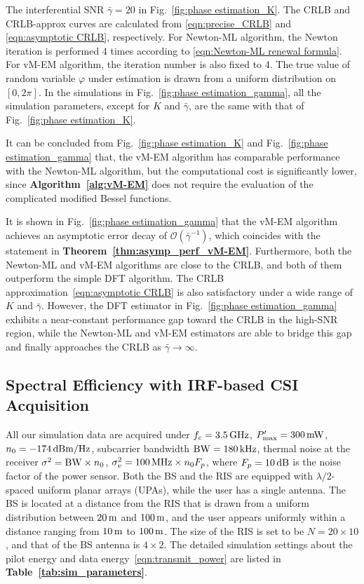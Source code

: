 \documentclass[journal,twocolumn]{IEEEtran}
\theoremstyle{nonumberplain}
\begin{document}
    The interferential SNR $\bar{\gamma}=20$ in Fig.~\ref{fig:phase estimation_K}. 
    The CRLB and CRLB-approx curves are calculated from \eqref{eqn:precise_CRLB} and \eqref{eqn:asymptotic CRLB}, respectively. 
    For Newton-ML algorithm, the Newton iteration is performed 4 times according to \eqref{eqn:Newton-ML renewal formula}. 
    For vM-EM algorithm, the iteration number is also fixed to 4. The true value of random variable $\varphi$ under estimation is drawn from a uniform distribution on $[0,2\pi]$. 
    In the simulations in Fig.~\ref{fig:phase estimation_gamma}, all the simulation parameters, except for $K$ and $\bar{\gamma}$, are the same with that of Fig.~\ref{fig:phase estimation_K}.

    It can be concluded from Fig.~\ref{fig:phase estimation_K} and Fig.~\ref{fig:phase estimation_gamma} that, the vM-EM algorithm has comparable performance with the Newton-ML algorithm, but the computational cost is significantly lower, since {\bf Algorithm~\ref{alg:vM-EM}} does not require the evaluation of the complicated modified Bessel functions. 
    
    It is shown in Fig.~\ref{fig:phase estimation_gamma} that the vM-EM algorithm achieves an asymptotic error decay of $\mathcal{O}(\bar{\gamma}^{-1})$, which coincides with the statement in {\bf Theorem~\ref{thm:asymp_perf_vM-EM}}. Furthermore, both the Newton-ML and vM-EM algorithms are close to the CRLB, and both of them outperform the simple DFT algorithm. The CRLB approximation~\eqref{eqn:asymptotic CRLB} is also satisfactory under a wide range of $K$ and $\bar{\gamma}$. However, the DFT estimator in Fig.~\ref{fig:phase estimation_gamma} exhibits a near-constant performance gap toward the CRLB in the high-SNR region, while the Newton-ML and vM-EM estimators are able to bridge this gap and finally approaches the CRLB as $\bar{\gamma}\to\infty$. 
    

\subsection{Spectral Efficiency with IRF-based CSI Acquisition} \label{Achievable Spectral Efficiency under IRF}

    All our simulation data are acquired under $f_c = 3.5\,{\rm GHz}$, $P_{\rm max}'=300 \,{\rm mW}$, $n_0=-174\,{\rm dBm/Hz}$, subcarrier bandwidth ${\rm BW} = 180\,{\rm kHz}$, thermal noise at the receiver $\sigma^2 = {\rm BW}\times n_0$, $\sigma_v^2=100\,{\rm MHz}\times n_0 F_p$, where $F_p=10\,{\rm dB}$ is the noise factor of the power sensor. 
    Both the BS and the RIS are equipped with $\lambda/2$-spaced uniform planar arrays (UPAs), while the user has a single antenna. 
    The BS is located at a distance from the RIS that is drawn from a uniform distribution between $20\,{\rm m}$ and $100\,{\rm m}$, and the user appears uniformly within a distance ranging from $10\,{\rm m}$ to $100\,{\rm m}$.
    The size of the RIS is set to be $N=20\times 10$, and that of the BS antenna is $4\times 2$. The detailed simulation settings about the pilot energy and data energy~\eqref{eqn:transmit_power} are listed in {\bf Table~\ref{tab:sim_parameters}}.
    
\end{document}
